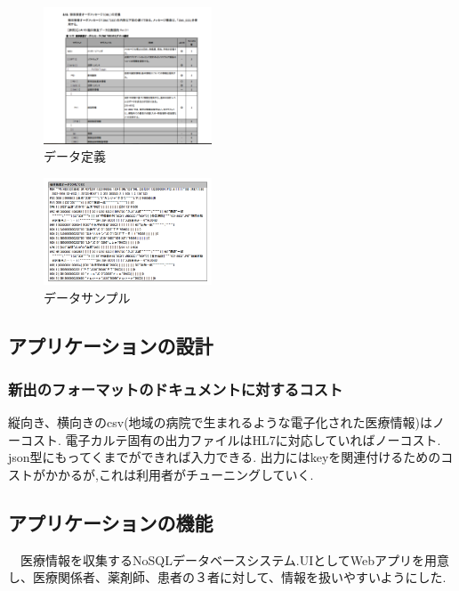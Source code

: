 	\begin{figure}[htbp]
		\begin{center}
			\includegraphics[width=5cm, bb=0 0 645 790]{./gazou/ss-mix_sample.png} %
		\end{center}
		\caption{データ定義}
		\label{ss-mix_sample}
	\end{figure}

	\begin{figure}[htbp]
		\begin{center}
			\includegraphics[width=5cm, bb=0 0 437 688]{ss-mix_sampledata.png}
		\end{center}
		\caption{データサンプル}
		\label{ss-mix_sampledata}
	\end{figure}

\subsection{アプリケーションの設計}

	\subsubsection{新出のフォーマットのドキュメントに対するコスト}
	縦向き、横向きのcsv(地域の病院で生まれるような電子化された医療情報)はノーコスト.
	電子カルテ固有の出力ファイルはHL7に対応していればノーコスト.
	json型にもってくまでができれば入力できる.
	出力にはkeyを関連付けるためのコストがかかるが,これは利用者がチューニングしていく.


\subsection{アプリケーションの機能}
　医療情報を収集するNoSQLデータベースシステム.UIとしてWebアプリを用意し、医療関係者、薬剤師、患者の３者に対して、情報を扱いやすいようにした.

